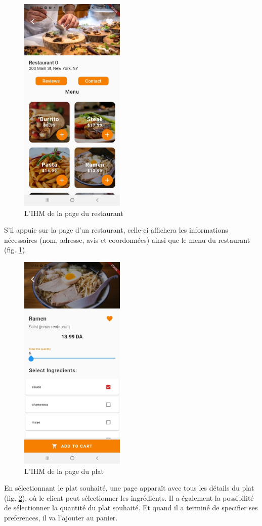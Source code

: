 \documentclass[french, a4paper, 12pt]{report}
\begin{document}
\newpage


			\begin{figure}[h!]
			\center
			\includegraphics[width=5cm]{screenshots/ClientViews/Restaurantmenu.jpg}
			\caption{L'IHM de la page du restaurant}
			\label{fig:clires}
		\end{figure} S'il appuie sur la page d'un restaurant, celle-ci affichera les informations nécessaires (nom, adresse, avis et coordonnées) ainsi que le menu du restaurant (fig. \ref{fig:clires}).

\newpage

			\begin{figure}[h!]
			\center
			\includegraphics[width=5cm]{screenshots/ClientViews/Dishdetails.jpg}
			\caption{L'IHM de la page du plat}
			\label{fig:clidd}
		\end{figure} En sélectionnant le plat souhaité, une page apparaît avec tous les détails du plat (fig. \ref{fig:clidd}), où le client peut sélectionner les ingrédients. Il a également la possibilité de sélectionner la quantité du plat souhaité. Et quand il a terminé de specifier ses preferences, il va l'ajouter au panier. 
\end{document}
